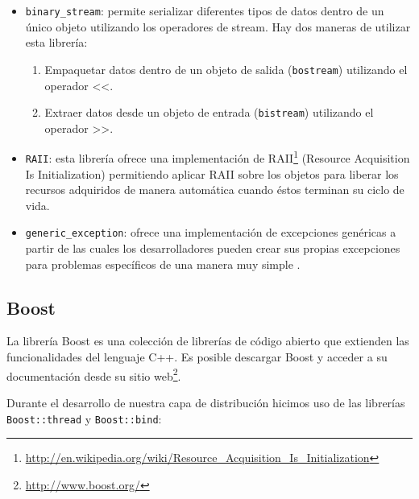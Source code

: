 \begin{itemize}
\item \texttt{binary\_stream}: permite serializar diferentes tipos de datos dentro de un único objeto utilizando los operadores de stream. Hay dos maneras de utilizar esta librería:
\begin{enumerate}
\item Empaquetar datos dentro de un objeto de salida (\texttt{bostream}) utilizando el operador <<.
\item Extraer datos desde un objeto de entrada (\texttt{bistream}) utilizando el operador >>.
\end{enumerate}

\item \texttt{RAII}: esta librería ofrece una implementación de RAII\footnote{\url{http://en.wikipedia.org/wiki/Resource_Acquisition_Is_Initialization}} (Resource Acquisition Is Initialization) permitiendo aplicar RAII sobre los objetos para liberar los recursos adquiridos de manera automática cuando éstos terminan su ciclo de vida.

\item \texttt{generic\_exception}: ofrece una implementación de excepciones genéricas a partir de las cuales los desarrolladores pueden crear sus propias excepciones para problemas específicos de una manera muy simple .
\end{itemize}

\subsection{Boost}

La librería Boost es una colección de librerías de código abierto que extienden las funcionalidades del lenguaje C++. Es posible descargar Boost y acceder a su documentación desde su sitio web\footnote{\url{http://www.boost.org/}}.

Durante el desarrollo de nuestra capa de distribución hicimos uso de las librerías \texttt{Boost::thread} y \texttt{Boost::bind}:

